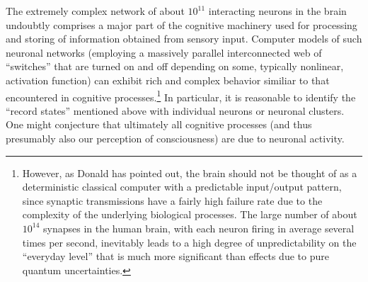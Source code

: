 \documentclass[twocolumn,aps,floatfix,amsmath,amssymb,showpacs,nofootinbib]{revtex4}
\begin{document}
The extremely complex network of about $10^{11}$ interacting neurons
in the brain undoubtly comprises a major part of the cognitive
machinery used for processing and storing of information obtained from
sensory input.  Computer models of such neuronal networks (employing a
massively parallel interconnected web of ``switches'' that are turned
on and off depending on some, typically nonlinear, activation
function) can exhibit rich and complex behavior similiar to that
encountered in cognitive processes.\footnote{However, as Donald
  \cite{Donald:2002:um} has pointed out, the brain should not be
  thought of as a deterministic classical computer with a predictable
  input/output pattern, since synaptic transmissions have a fairly
  high failure rate due to the complexity of the underlying biological
  processes.  The large number of about $10^{14}$ synapses in the
  human brain, with each neuron firing in average several times per
  second, inevitably leads to a high degree of unpredictability on the
  ``everyday level'' that is much more significant than effects due to
  pure quantum uncertainties.  } In particular, it is reasonable to
identify the ``record states'' mentioned above with individual neurons
or neuronal clusters.  One might conjecture that ultimately all
cognitive processes (and thus presumably also our perception of
consciousness) are due to neuronal activity.
\end{document}
